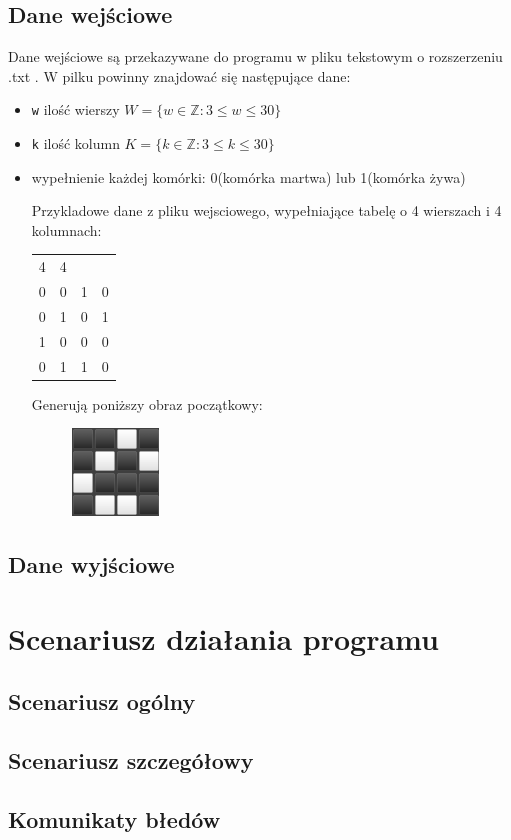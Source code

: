 \documentclass{article}
\begin{document}
\subsection{Dane wej\'sciowe}
Dane wej\'sciowe s\k{a} przekazywane do programu w pliku tekstowym o rozszerzeniu .txt . W pilku powinny znajdowa\'c si\k{e} nast\k{e}puj\k{a}ce dane: 
\begin{itemize}
	\item \texttt{w} ilo\'s\'c wierszy $W = \{ w \in \mathbb{Z} : 3 \leq w \leq 30 \} $
	\item \texttt{k} ilo\'s\'c kolumn $K = \{ k \in \mathbb{Z} : 3 \leq k \leq 30 \} $
	\item wype\l{}nienie ka\.zdej kom\'orki: 0(kom\'orka martwa) lub 1(kom\'orka \.zywa)
		
		Przykladowe dane z pliku wejsciowego, wype\l{}niaj\k{a}ce tabel\k{e} o 4 wierszach i 4 kolumnach:
		\begin{table}[h!]
		\begin{center}
			\begin{tabular}{c c c c}
				4 & 4         \\
				0 & 0 & 1 & 0 \\
				0 & 1 & 0 & 1 \\
				1 & 0 & 0 & 0 \\
				0 & 1 & 1 & 0 \\
			\end{tabular}
		\end{center}
		\end{table}

		Generuj\k{a} poni\.zszy obraz pocz\k{a}tkowy:

		\begin{figure}[h]
			\centering
			\includegraphics{obraz}
		\end{figure}
\end{itemize}

\subsection{Dane wyj\'sciowe}


\section{Scenariusz dzia\l{}ania programu}
\subsection{Scenariusz og\'olny}
\subsection{Scenariusz szczeg\'o\l{}owy}
\subsection{Komunikaty b\l{}ed\'ow}
\end{document}
